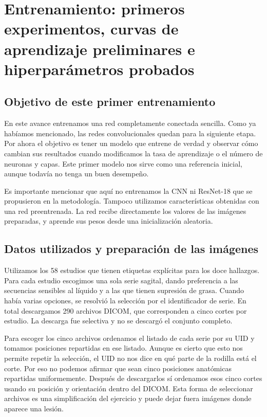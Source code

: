\documentclass[eng]{ajceam-class}
\begin{document}
\section{Entrenamiento: primeros experimentos, curvas de aprendizaje preliminares e hiperparámetros probados}

\subsection{Objetivo de este primer entrenamiento}

En este avance entrenamos una red completamente conectada sencilla. Como ya habíamos mencionado, las redes convolucionales quedan para la siguiente etapa. Por ahora el objetivo es tener un modelo que entrene de verdad y observar cómo cambian sus resultados cuando modificamos la tasa de aprendizaje o el número de neuronas y capas. Este primer modelo nos sirve como una referencia inicial, aunque todavía no tenga un buen desempeño.

Es importante mencionar que aquí no entrenamos la CNN ni ResNet-18 que se propusieron en la metodología. Tampoco utilizamos características obtenidas con una red preentrenada. La red recibe directamente los valores de las imágenes preparadas, y aprende sus pesos desde una inicialización aleatoria.

\subsection{Datos utilizados y preparación de las imágenes}

Utilizamos los 58 estudios que tienen etiquetas explícitas para los doce hallazgos. Para cada estudio escogimos una sola serie sagital, dando preferencia a las secuencias sensibles al líquido y a las que tienen supresión de grasa. Cuando había varias opciones, se resolvió la selección por el identificador de serie. En total descargamos 290 archivos DICOM, que corresponden a cinco cortes por estudio. La descarga fue selectiva y no se descargó el conjunto completo.

Para escoger los cinco archivos ordenamos el listado de cada serie por su UID y tomamos posiciones repartidas en ese listado. Aunque es cierto que esto nos permite repetir la selección, el UID no nos dice en qué parte de la rodilla está el corte. Por eso no podemos afirmar que sean cinco posiciones anatómicas repartidas uniformemente. Después de descargarlos sí ordenamos esos cinco cortes usando su posición y orientación dentro del DICOM. Esta forma de seleccionar archivos es una simplificación del ejercicio y puede dejar fuera imágenes donde aparece una lesión.
\end{document}
